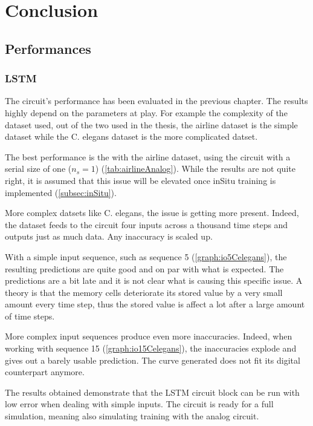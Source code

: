 \section{Conclusion}\label{sec:conc}

\subsection{Performances}

\subsubsection{\ac{LSTM}}

The circuit's performance has been evaluated in the previous chapter. The results highly depend on the parameters at play. For example the complexity of the dataset used, out of the two used in the thesis, the airline dataset is the simple dataset while the \ac{C. elegans} dataset is the more complicated datset.

The best performance is the with the airline dataset, using the circuit with a serial size of one ($n_s=1$) (\cref{tab:airlineAnalog}). While the results are not quite right, it is assumed that this issue will be elevated once inSitu training is implemented (\cref{subsec:inSitu}).

More complex datsets like \ac{C. elegans}, the issue is getting more present. Indeed, the dataset feeds to the circuit four inputs across a thousand time steps and outputs just as much data. Any inaccuracy is scaled up.

With a simple input sequence, such as sequence 5 (\cref{graph:io5Celegans}), the resulting predictions are quite good and on par with what is expected. The predictions are a bit late and it is not clear what is causing this specific issue. A theory is that the memory cells deteriorate its stored value by a very small amount every time step, thus the stored value is affect a lot after a large amount of time steps.

More complex input sequences produce even more inaccuracies. Indeed, when working with sequence 15 (\cref{graph:io15Celegans}), the inaccuracies explode and gives out a barely usable prediction. The curve generated does not fit its digital counterpart anymore.

The results obtained demonstrate that the \ac{LSTM} circuit block can be run with low error when dealing with simple inputs. The circuit is ready for a full simulation, meaning also simulating training with the analog circuit.

